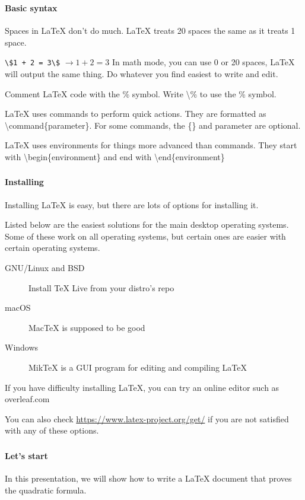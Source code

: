 \documentclass{beamer}
\begin{document}
	\begin{frame}
		\frametitle{\secname}
		\framesubtitle{Basic syntax}
		\begin{description}[<+->]
			\item[Spacing] Spaces in \LaTeX{} don't do much. \LaTeX{} treats 20 spaces the same as it treats 1 space.
			\item[Inline math] \lstinline{\$1 + 2 = 3\$} $\rightarrow 1 + 2 = 3$ In math mode, you can use 0 or 20 spaces, \LaTeX{} will output the same thing. Do whatever you find easiest to write and edit.
			\item[Comments] Comment \LaTeX{} code with the \% symbol. Write \textbackslash\% to use the \% symbol.
			\item[Commands] \LaTeX{} uses commands to perform quick actions. They are formatted as \textbackslash command\{parameter\}. For some commands, the \{\} and parameter are optional.
			\item[Environments] \LaTeX{} uses environments for things more advanced than commands. They start with \textbackslash begin\{environment\} and end with \textbackslash end\{environment\}
		\end{description}
	\end{frame}
	\begin{frame}
		\frametitle{\secname}
		\framesubtitle{Installing}
		Installing \LaTeX{} is easy, but there are lots of options for installing it.
		
		Listed below are the easiest solutions for the main desktop operating systems. Some of these work on all operating systems, but certain ones are easier with certain operating systems.
		\begin{description}
			\item[GNU/Linux and BSD] Install \TeX{} Live from your distro's repo
			\item[macOS] Mac\TeX{} is supposed to be good
			\item[Windows] MikTeX is a GUI program for editing and compiling \LaTeX{}
		\end{description}
		If you have difficulty installing \LaTeX{}, you can try an online editor such as overleaf.com

		You can also check \url{https://www.latex-project.org/get/} if you are not satisfied with any of these options.
	\end{frame}
	\begin{frame}
		\frametitle{\secname}
		\framesubtitle{Let's start}
		In this presentation, we will show how to write a \LaTeX{} document that proves the quadratic formula.
	\end{frame}
\end{document}
